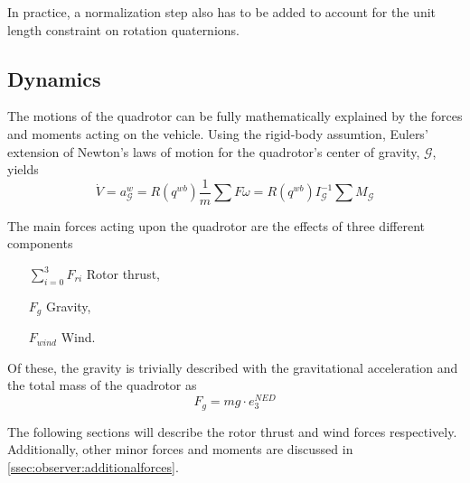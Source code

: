         In practice, a normalization step also has to be added to account for
        the unit length constraint on rotation quaternions.


    \subsection{Dynamics}
        The motions of the quadrotor can be fully mathematically explained by the
        forces and moments acting on the vehicle. Using the rigid-body assumtion,
        Eulers' extension of Newton's laws of motion for the
        quadrotor's center of gravity, $\mathcal{G}$, yields
        \begin{subequations}
            \begin{equation}
                \dot{V} = a^{w}_{\mathcal{G}} = R(q^{wb})\frac{1}{m}\sum F
            \end{equation}
            \begin{equation}
                \dot{\omega} = R(q^{wb})I_{\mathcal{G}}^{-1}\sum M_{\mathcal{G}}
            \end{equation}
        \end{subequations}

        The main forces acting upon the quadrotor are the effects of three different components
        \begin{itemize}
            \item[$\sum_{i=0}^{3}F_{ri}$] Rotor thrust,
            \item[$F_{g}$] Gravity,
            \item[$F_{wind}$] Wind.
        \end{itemize}

        Of these, the gravity is trivially described with the
        gravitational acceleration and the total mass of the quadrotor as
        \begin{equation}
            F_{g} = mg\cdot e_{3}^{NED}
        \end{equation}

        The following sections will describe the rotor thrust and wind forces respectively.
        Additionally, other minor forces and moments are discussed in
        \ref{ssec:observer:additionalforces}.

        
        
        
